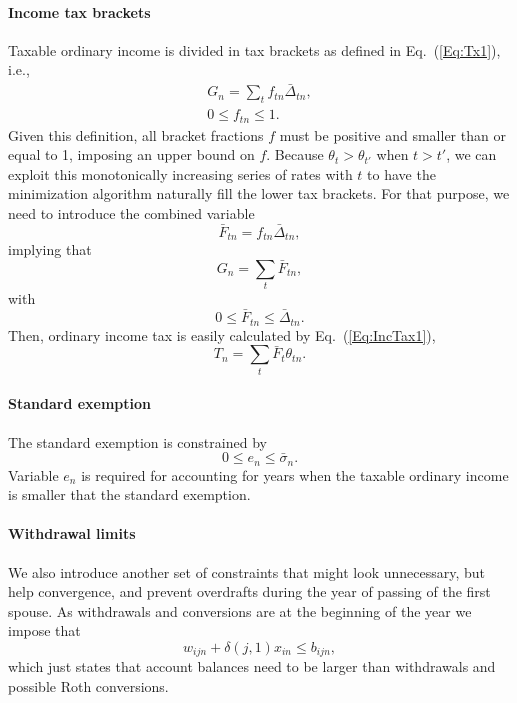 \documentclass{report}[fleqn,11pt]
\begin{document}
\paragraph*{Income tax brackets}
	Taxable ordinary income is divided in tax brackets as defined in Eq.~(\ref{Eq:Tx1}), i.e.,
	\begin{eqnarray}
		\label{Eq:C2}
		G_n = \sum_t f_{tn}\bar{\Delta}_{tn} ,\nonumber\\
		0 \leq f_{tn} \leq 1.
	\end{eqnarray}
	Given this definition, all bracket fractions $f$ must be positive and smaller than or equal to 1,
	imposing an upper bound on $f$.
	Because $\theta_{t} > \theta_{t'}$ when $t > t'$, we can exploit
	this monotonically increasing series of rates with $t$ to have the minimization
	algorithm naturally fill the lower tax brackets.
	For that purpose, we need to introduce the combined variable
	\begin{equation}
		\bar{F}_{tn} = f_{tn}\bar{\Delta}_{tn},
	\end{equation}
	implying that
	\begin{equation}
		G_n = \sum_t \bar{F}_{tn},
	\end{equation}
	with
	\begin{equation}
		0 \le \bar{F}_{tn} \le \bar{\Delta}_{tn}.
	\end{equation}
	Then, ordinary income tax is easily calculated by Eq.~(\ref{Eq:IncTax1}), 
	\begin{equation*}
		T_n = \sum_t \bar{F}_t \theta_{tn}.
	\end{equation*}

\paragraph*{Standard exemption}
	The standard exemption is constrained by
	\begin{equation}
		0 \le e_n \le \bar{\sigma}_n.
	\end{equation}
	Variable $e_n$ is required for accounting for years when the taxable ordinary
	income is smaller that the standard exemption.

\paragraph*{Withdrawal limits}
	We also introduce another set of constraints that might look unnecessary, but help
	convergence, and prevent overdrafts during the year of passing of the first spouse.
	As withdrawals and conversions are at the beginning of the year 
	we impose that
	\begin{equation}
		w_{ijn} + \delta(j, 1)x_{in} \le b_{ijn},
	\end{equation}
	which just states that account balances need to be larger than withdrawals and possible Roth conversions.
\end{document}

